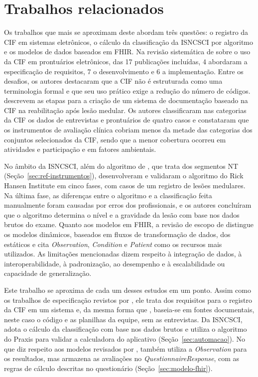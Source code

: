 \section{Trabalhos relacionados}
\label{sec:ref-relacionados}

Os trabalhos que mais se aproximam deste abordam três questões: o registro da CIF em sistemas eletrônicos, o cálculo
da classificação da ISNCSCI por algoritmo e os modelos de dados baseados em FHIR. Na revisão sistemática de
 sobre o uso da CIF em prontuários eletrônicos, das 17 publicações incluídas, 4
abordaram a especificação de requisitos, 7 o desenvolvimento e 6 a implementação. Entre os desafios, os autores
destacaram que a CIF não é estruturada como uma terminologia formal e que seu uso prático exige a redução do número
de códigos.  descrevem as etapas para a criação de um sistema de documentação
baseado na CIF na reabilitação após lesão medular. Os autores classificaram nas categorias da CIF os dados de
entrevistas e prontuários de quatro casos e constataram que os instrumentos de avaliação clínica cobriam menos da
metade das categorias dos conjuntos selecionados da CIF, sendo que a menor cobertura ocorreu em atividades e
participação e em fatores ambientais.

No âmbito da ISNCSCI, além do algoritmo de , que trata dos segmentos NT
(Seção~\ref{sec:ref-instrumentos}),  desenvolveram e validaram o algoritmo do
Rick Hansen Institute em cinco fases, com casos de um registro de lesões medulares. Na última fase, as diferenças
entre o algoritmo e a classificação feita manualmente foram causadas por erros dos profissionais, e os autores
concluíram que o algoritmo determina o nível e a gravidade da lesão com base nos dados brutos do exame. Quanto aos
modelos em FHIR, a revisão de escopo de  distingue os modelos dinâmicos, baseados em
fluxos de transformação de dados, dos estáticos e cita \textit{Observation}, \textit{Condition} e \textit{Patient}
como os recursos mais utilizados. As limitações mencionadas dizem respeito à integração de dados, à
interoperabilidade, à padronização, ao desempenho e à escalabilidade ou capacidade de generalização.

Este trabalho se aproxima de cada um desses estudos em um ponto. Assim como os trabalhos de especificação revistos
por , ele trata dos requisitos para o registro da CIF em um sistema e, da mesma forma que
, baseia-se em fontes documentais, neste caso o código e as planilhas da equipe,
sem as entrevistas. Da ISNCSCI, adota o cálculo da classificação com base nos dados brutos e utiliza o algoritmo do
Praxis para validar a calculadora do aplicativo (Seção~\ref{sec:automacao}). No que diz respeito aos modelos
revisados por , também utiliza a \textit{Observation} para os resultados, mas armazena as
avaliações no \textit{QuestionnaireResponse}, com as regras de cálculo descritas no questionário
(Seção~\ref{sec:modelo-fhir}).
